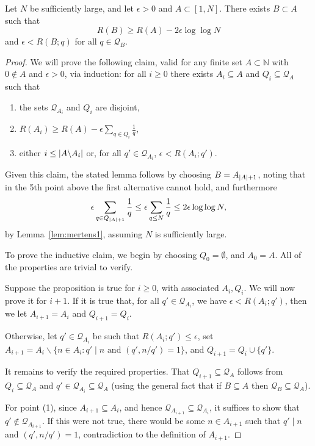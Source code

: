 \begin{lemma}\label{lem:pisqa}
  \leanok
Let $N$ be sufficiently large, and let $\epsilon>0$ and $A\subset[1,N]$. There exists $B\subset A$ such that
\[R(B)\geq  R(A)-2\epsilon\log\log N\]
and $\epsilon < R(B;q)$ for all $q\in \mathcal{Q}_B$.
\end{lemma}
\begin{proof}
\leanok
We will prove the following claim, valid for any finite set $A\subset \mathbb{N}$ with $0\not\in A$ and $\epsilon>0$, via induction: for all $i\geq 0$ there exists $A_i\subseteq A$ and $Q_i\subseteq \mathcal{Q}_A$ such that
\begin{enumerate}
\item the sets $\mathcal{Q}_{A_i}$ and $Q_i$ are disjoint,
\item $R(A_i)\geq R(A)- \epsilon\sum_{q\in Q_i}\frac{1}{q}$,
\item either $i\leq \left\lvert A\backslash A_i\right\rvert$ or, for all $q'\in \mathcal{Q}_{A_i}$, $\epsilon < R(A_i;q')$.
\end{enumerate}

Given this claim, the stated lemma follows by choosing $B=A_{\left\lvert A\right\rvert+1}$, noting that in the 5th point above the first alternative cannot hold, and furthermore
\[\epsilon \sum_{q\in Q_{\left\lvert A\right\rvert+1}}\frac{1}{q}\leq \epsilon \sum_{q\leq N}\frac{1}{q}\leq 2\epsilon \log\log N,\]
by Lemma~\ref{lem:mertens1}, assuming $N$ is sufficiently large.

To prove the inductive claim, we begin by choosing $Q_0=\emptyset$, and $A_0=A$. All of the properties are trivial to verify.

Suppose the proposition is true for $i\geq 0$, with associated $A_i,Q_i$. We will now prove it for $i+1$. If it is true that, for all $q'\in\mathcal{Q}_{A_i}$, we have $\epsilon <R(A_i;q')$, then we let $A_{i+1}=A_i$ and $Q_{i+1}=Q_i$.

Otherwise, let $q'\in \mathcal{Q}_{A_i}$ be such that $R(A_i;q')\leq \epsilon$, set $A_{i+1} = A_i\backslash \{ n\in A_i : q'\mid n \textrm{ and }(q',n/q')=1\}$, and $Q_{i+1}=Q_i\cup \{q'\}$.

It remains to verify the required properties. That $Q_{i+1}\subseteq \mathcal{Q}_A$ follows from $Q_i\subseteq \mathcal{Q}_A$ and $q'\in \mathcal{Q}_{A_i}\subseteq \mathcal{Q}_A$  (using the general fact that if $B\subseteq A$ then $\mathcal{Q}_B\subseteq \mathcal{Q}_A$).

For point (1), since $A_{i+1}\subseteq A_i$, and hence $\mathcal{Q}_{A_{i+1}}\subseteq \mathcal{Q}_{A_i}$, it suffices to show that $q'\not\in \mathcal{Q}_{A_{i+1}}$. If this were not true, there would be some $n\in A_{i+1}$ such that $q'\mid n$ and $(q',n/q')=1$, contradiction to the definition of $A_{i+1}$.


\end{proof}
